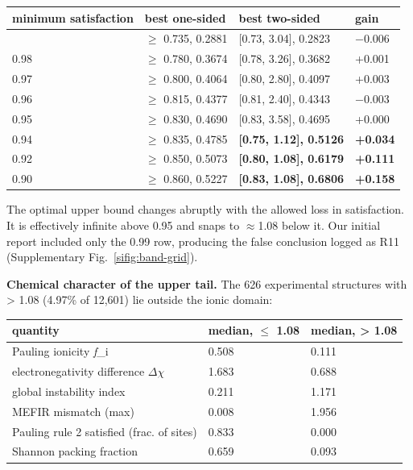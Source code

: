 {\def\LTcaptype{none} %
\begin{longtable}[]{@{}llll@{}}
\toprule\noalign{}
minimum satisfaction & best one-sided & best two-sided & gain \\
\midrule\noalign{}
\endhead
\bottomrule\noalign{}
\endlastfoot
0.99 & \rhoc{} $\geq$ 0.735, 0.2881 & {[}0.73, 3.04{]}, 0.2823 & $-$0.006 \\
0.98 & \rhoc{} $\geq$ 0.780, 0.3674 & {[}0.78, 3.26{]}, 0.3682 & +0.001 \\
0.97 & \rhoc{} $\geq$ 0.800, 0.4064 & {[}0.80, 2.80{]}, 0.4097 & +0.003 \\
0.96 & \rhoc{} $\geq$ 0.815, 0.4377 & {[}0.81, 2.40{]}, 0.4343 & $-$0.003 \\
0.95 & \rhoc{} $\geq$ 0.830, 0.4690 & {[}0.83, 3.58{]}, 0.4695 & +0.000 \\
0.94 & \rhoc{} $\geq$ 0.835, 0.4785 & \textbf{{[}0.75, 1.12{]}, 0.5126} & \textbf{+0.034} \\
0.92 & \rhoc{} $\geq$ 0.850, 0.5073 & \textbf{{[}0.80, 1.08{]}, 0.6179} & \textbf{+0.111} \\
0.90 & \rhoc{} $\geq$ 0.860, 0.5227 & \textbf{{[}0.83, 1.08{]}, 0.6806} & \textbf{+0.158} \\
\end{longtable}
}

The optimal upper bound changes abruptly with the allowed loss in satisfaction.
It is effectively infinite above 0.95 and snaps to $\approx$1.08 below it. Our
initial report included only the 0.99 row, producing the false conclusion logged
as R11 (Supplementary Fig.~\ref{sifig:band-grid}).

\textbf{Chemical character of the upper tail.} The 626 experimental structures
with \rhoc{} \textgreater{} 1.08 (4.97\% of 12,601) lie outside the ionic domain:

{\def\LTcaptype{none} %
\begin{longtable}[]{@{}lll@{}}
\toprule\noalign{}
quantity & median, \rhoc{} $\leq$ 1.08 & median, \rhoc{} \textgreater{} 1.08 \\
\midrule\noalign{}
\endhead
\bottomrule\noalign{}
\endlastfoot
Pauling ionicity \emph{f}\_i & 0.508 & 0.111 \\
electronegativity difference $\Delta$$\chi$ & 1.683 & 0.688 \\
global instability index & 0.211 & 1.171 \\
MEFIR mismatch (max) & 0.008 & 1.956 \\
Pauling rule 2 satisfied (frac. of sites) & 0.833 & 0.000 \\
Shannon packing fraction & 0.659 & 0.093 \\
\end{longtable}
}

